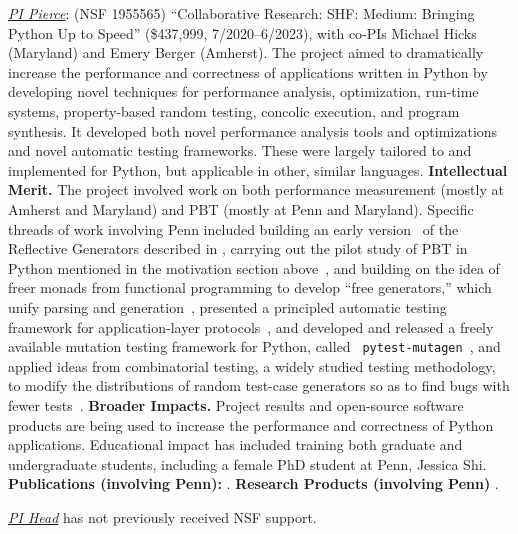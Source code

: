 \emph{\underline{PI Pierce}}: (NSF 1955565) ``Collaborative Research:
SHF: Medium: Bringing Python Up to Speed'' (\$437,999,
7/2020--6/2023), with co-PIs Michael Hicks (Maryland) and Emery Berger
(Amherst).
The project aimed to dramatically increase the performance and
correctness of applications written in Python by developing novel
techniques for performance analysis, optimization, run-time systems,
property-based random testing, concolic execution, and program
synthesis. It developed both
novel performance analysis tools and optimizations and novel automatic
testing frameworks. These were largely tailored to and implemented for
Python, but applicable in other, similar languages.
%
{\bf Intellectual Merit.} The project involved work on both
performance measurement (mostly at Amherst and Maryland) and PBT (mostly at Penn
and Maryland).  Specific threads of work involving Penn included
building an early
version~\cite{Frohlich2022} of the Reflective Generators described in
, carrying out the pilot study of PBT in Python
mentioned in the motivation section
above~\cite{goldstein_problems_2022}, and building on the idea of
freer monads from functional programming to develop ``free
generators,'' which unify parsing and
generation~\cite{goldstein2022parsing}, presented a principled
automatic testing framework for application-layer
protocols~\cite{Li2021:MBToNA}, and developed and released a freely
available mutation testing framework for Python, called {\tt
  pytest-mutagen}~\cite{pytestmutagen}, and applied ideas from
combinatorial testing, a widely studied testing methodology, to modify
the distributions of random test-case generators so as to find bugs
with fewer tests~\cite{DBLP:conf/esop/GoldsteinHLP21}.
%
{\bf Broader Impacts.} Project results and open-source software
products are being used to increase the
performance and correctness of Python applications.
Educational impact has included training both graduate and
undergraduate students, including a female PhD student at Penn, Jessica
Shi.
%
{\bf Publications (involving Penn):} \cite{Frohlich2022,DBLP:conf/esop/GoldsteinHLP21,
  goldstein2022parsing, goldstein_problems_2022, Li2021:MBToNA}.
{\bf Research Products (involving Penn)} \cite{pytestmutagen}.

\smallskip

\noindent\emph{\underline{PI Head}} has not previously received NSF support.

